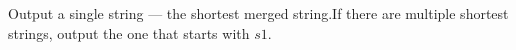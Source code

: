 Output a single string --- the shortest merged string.If there are multiple shortest strings, output the one that starts with $s1$.
